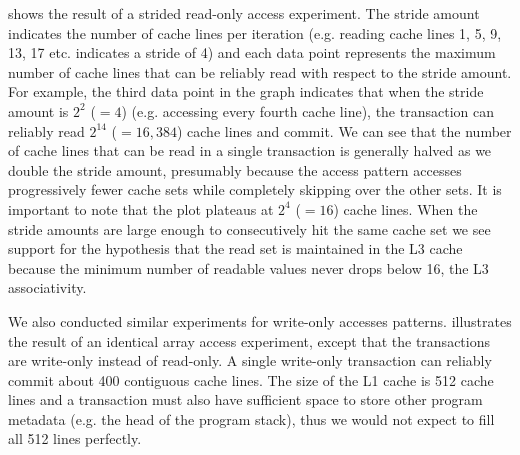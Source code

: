  shows the result of a strided read-only
access experiment. The stride amount indicates 
the number of cache lines per
iteration (e.g. reading cache lines 1, 5, 9, 13, 17 etc. 
indicates a stride of 4) and each data point 
represents the maximum number of cache
lines that can be reliably read with respect 
to the stride amount. For example,
the third data point in the graph indicates 
that when the stride amount is
$2^2$ ($=4$) (e.g. accessing every fourth cache line), 
the transaction can reliably read
$2^{14}$ ($=16,384$) cache lines and commit. 
We can see that the number of cache lines that can be 
read in a single transaction is generally
halved as we double the stride amount, presumably 
because the access pattern
accesses progressively fewer cache sets while 
completely skipping over the other sets.
It is important to note that the plot plateaus 
at $2^4$ ($=16$) cache lines.
When the stride amounts are large enough to consecutively
hit the same cache set we see support for 
the hypothesis that the read set is
maintained in the {L3} cache because the minimum number
of readable values never drops below 16, 
the L3 associativity.


We also conducted similar experiments for write-only accesses
patterns.   illustrates 
the result of an
identical array access experiment, except that the 
transactions are write-only
instead of read-only. A single write-only transaction 
can reliably commit about 400 contiguous cache lines. The
size of the {L1} cache is 512 cache lines and a transaction must also
have sufficient space to store other program metadata (e.g. the
head of the program stack), thus we would not expect to fill
all 512 lines perfectly.

